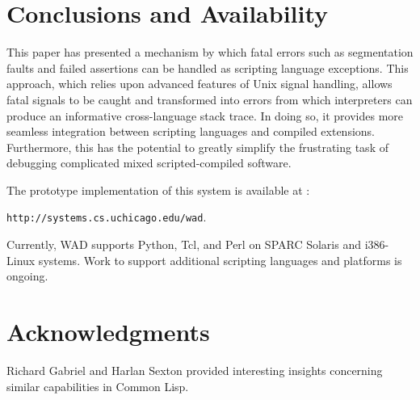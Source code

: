 \section{Conclusions and Availability}

This paper has presented a mechanism by which fatal errors such as
segmentation faults and failed assertions can be handled as scripting
language exceptions.  This approach, which relies upon advanced
features of Unix signal handling, allows fatal signals to be caught
and transformed into errors from which interpreters can produce an
informative cross-language stack trace. In doing so, it provides more
seamless integration between scripting languages and compiled
extensions.  Furthermore, this has the potential to greatly simplify the
frustrating task of debugging complicated mixed scripted-compiled
software.

The prototype implementation of this system is available at :

\begin{center}
{\tt http://systems.cs.uchicago.edu/wad}.
\end{center}

\noindent
Currently, WAD supports Python,
Tcl, and Perl on SPARC Solaris and i386-Linux systems.  Work to
support additional scripting languages and platforms is ongoing.

\section{Acknowledgments}

Richard Gabriel and Harlan Sexton provided interesting insights concerning similar capabilities
in Common Lisp.

